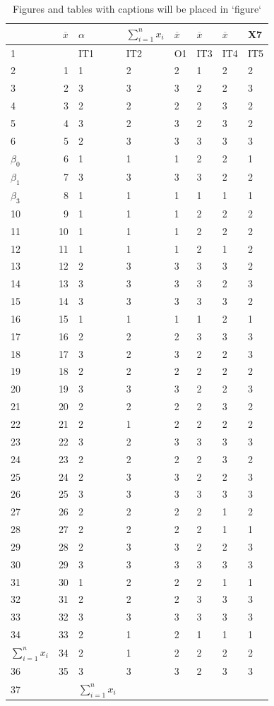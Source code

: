 \documentclass[10pt,]{krantz}
\theoremstyle{definition}
\theoremstyle{definition}
\theoremstyle{definition}
\theoremstyle{definition}
\theoremstyle{remark}
\begin{document}
\begin{longtable}[t]{lrllllll}
\caption{\label{tab:unnamed-chunk-46}Figures and tables with captions will be placed in `figure`}\\
\toprule
  & $\overline{x}$ & $\alpha$ & $\sum^{n}_{i=1}{x_i}$ & $\overline{x}$ & $\overline{x}$ & $\overline{x}$ & X7\\
\midrule
1 &  & IT1 & IT2 & O1 & IT3 & IT4 & IT5\\
2 & 1 & 1 & 2 & 2 & 1 & 2 & 2\\
3 & 2 & 3 & 3 & 3 & 2 & 2 & 3\\
4 & 3 & 2 & 2 & 2 & 2 & 3 & 2\\
5 & 4 & 3 & 2 & 3 & 2 & 3 & 2\\
6 & 5 & 2 & 3 & 3 & 3 & 3 & 3\\
$\beta_0$ & 6 & 1 & 1 & 1 & 2 & 2 & 1\\
$\beta_1$ & 7 & 3 & 3 & 3 & 3 & 2 & 2\\
$\beta_3$ & 8 & 1 & 1 & 1 & 1 & 1 & 1\\
10 & 9 & 1 & 1 & 1 & 2 & 2 & 2\\
11 & 10 & 1 & 1 & 1 & 2 & 2 & 2\\
12 & 11 & 1 & 1 & 1 & 2 & 1 & 2\\
13 & 12 & 2 & 3 & 3 & 3 & 3 & 2\\
14 & 13 & 3 & 3 & 3 & 3 & 2 & 3\\
15 & 14 & 3 & 3 & 3 & 3 & 3 & 2\\
16 & 15 & 1 & 1 & 1 & 1 & 2 & 1\\
17 & 16 & 2 & 2 & 2 & 3 & 3 & 3\\
18 & 17 & 3 & 2 & 3 & 2 & 2 & 3\\
19 & 18 & 2 & 2 & 2 & 2 & 2 & 2\\
20 & 19 & 3 & 3 & 3 & 2 & 2 & 3\\
21 & 20 & 2 & 2 & 2 & 2 & 3 & 2\\
22 & 21 & 2 & 1 & 2 & 2 & 2 & 2\\
23 & 22 & 3 & 2 & 3 & 3 & 3 & 3\\
24 & 23 & 2 & 2 & 2 & 2 & 3 & 2\\
25 & 24 & 2 & 3 & 3 & 2 & 2 & 3\\
26 & 25 & 3 & 3 & 3 & 3 & 3 & 3\\
27 & 26 & 2 & 2 & 2 & 2 & 1 & 2\\
28 & 27 & 2 & 2 & 2 & 2 & 1 & 1\\
29 & 28 & 2 & 3 & 3 & 2 & 2 & 3\\
30 & 29 & 3 & 3 & 3 & 3 & 3 & 3\\
31 & 30 & 1 & 2 & 2 & 2 & 1 & 1\\
32 & 31 & 2 & 2 & 2 & 3 & 3 & 3\\
33 & 32 & 3 & 3 & 3 & 3 & 3 & 3\\
34 & 33 & 2 & 1 & 2 & 1 & 1 & 1\\
$\sum^{n}_{i=1}{x_i}$ & 34 & 2 & 1 & 2 & 2 & 2 & 2\\
36 & 35 & 3 & 3 & 3 & 2 & 3 & 3\\
37 &  & $\sum_{i=1}^nx_i$ &  &  &  &  & \\
\bottomrule
\end{longtable}



\printindex
\end{document}
